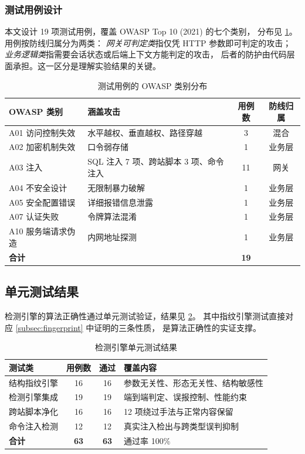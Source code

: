 \subsubsection{测试用例设计}

本文设计 19 项测试用例，覆盖 OWASP Top 10 (2021) 的七个类别，
分布见 \cref{tab:case-dist}。用例按防线归属分为两类：
\emph{网关可判定类}指仅凭 HTTP 参数即可判定的攻击；
\emph{业务逻辑类}指需要会话状态或后端上下文方能判定的攻击，
后者的防护由代码层面承担。这一区分是理解实验结果的关键。

\begin{table}[htbp]
\centering
\caption{测试用例的 OWASP 类别分布}
\label{tab:case-dist}
\small
\begin{tabular}{@{}l l c c@{}}
\toprule
\textbf{OWASP 类别} & \textbf{涵盖攻击} & \textbf{用例数} & \textbf{防线归属} \\
\midrule
A01 访问控制失效   & 水平越权、垂直越权、路径穿越 & 3 & 混合 \\
A02 加密机制失效   & 口令弱存储                   & 1 & 业务层 \\
A03 注入           & SQL 注入 7 项、跨站脚本 3 项、命令注入 & 11 & 网关 \\
A04 不安全设计     & 无限制暴力破解               & 1 & 业务层 \\
A05 安全配置错误   & 详细报错信息泄露             & 1 & 业务层 \\
A07 认证失败       & 令牌算法混淆                 & 1 & 业务层 \\
A10 服务端请求伪造 & 内网地址探测                 & 1 & 业务层 \\
\midrule
\textbf{合计}      &                              & \textbf{19} & \\
\bottomrule
\end{tabular}
\end{table}

\subsection{单元测试结果}

检测引擎的算法正确性通过单元测试验证，结果见 \cref{tab:unit-test}。
其中指纹引擎测试直接对应 \cref{subsec:fingerprint} 中证明的三条性质，
是算法正确性的实证支撑。

\begin{table}[htbp]
\centering
\caption{检测引擎单元测试结果}
\label{tab:unit-test}
\small
\begin{tabular}{@{}l c c l@{}}
\toprule
\textbf{测试类} & \textbf{用例数} & \textbf{通过} & \textbf{覆盖内容} \\
\midrule
结构指纹引擎     & 16 & 16 & 参数无关性、形态无关性、结构敏感性 \\
检测引擎集成     & 19 & 19 & 端到端判定、误报控制、性能约束 \\
跨站脚本净化     & 16 & 16 & 12 项绕过手法与正常内容保留 \\
命令注入检测     & 12 & 12 & 真实注入检出与跨类型误判抑制 \\
\midrule
\textbf{合计}    & \textbf{63} & \textbf{63} & 通过率 100\% \\
\bottomrule
\end{tabular}
\end{table}

